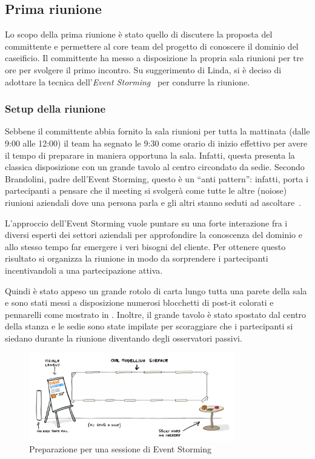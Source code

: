 \subsection{Prima riunione}
\label{sec:prima-riunione}
Lo scopo della prima riunione è stato quello di discutere la proposta del committente e permettere al core team del progetto di conoscere il dominio del caseificio. Il committente ha messo a disposizione la propria sala riunioni per tre ore per svolgere il primo incontro. 
Su suggerimento di Linda, si è deciso di adottare la tecnica dell'\emph{Event Storming}~\cite{cit:event-storming} per condurre la riunione. 


\subsubsection{Setup della riunione}
\label{sec:setup-della-riunione}
Sebbene il committente abbia fornito la sala riunioni per tutta la mattinata (dalle 9:00 alle 12:00) il team ha segnato le 9:30 come orario di inizio effettivo per avere il tempo di preparare in maniera opportuna la sala.
Infatti, questa presenta la classica disposizione con un grande tavolo al centro circondato da sedie. Secondo Brandolini, padre dell'Event Storming, questo è un ``anti pattern'': infatti, porta i partecipanti a pensare che il meeting si svolgerà come tutte le altre (noiose) riunioni aziendali dove una persona parla e gli altri stanno seduti ad ascoltare~\cite[pp.~116-118]{cit:event-storming-book}.

L'approccio dell'Event Storming vuole puntare su una forte interazione fra i diversi esperti dei settori aziendali per approfondire la conoscenza del dominio e allo stesso tempo far emergere i veri bisogni del cliente. Per ottenere questo risultato si organizza la riunione in modo da sorprendere i partecipanti incentivandoli a una partecipazione attiva.

Quindi è stato appeso un grande rotolo di carta lungo tutta una parete della sala e sono stati messi a disposizione numerosi blocchetti di post-it colorati e pennarelli come mostrato in . Inoltre, il grande tavolo è stato spostato dal centro della stanza e le sedie sono state impilate per scoraggiare che i partecipanti si siedano durante la riunione diventando degli osservatori passivi.

\begin{figure}[!ht]
  \centering
  \includegraphics[width=0.8\textwidth]{images/event-storming-setup.png}
  \caption{Preparazione per una sessione di Event Storming}
  \label{fig:event-storming-setup}
\end{figure}

